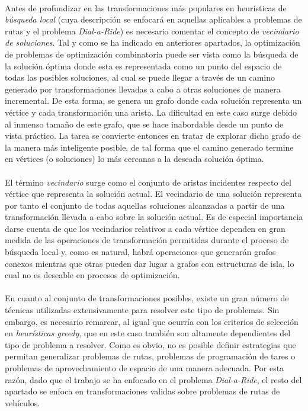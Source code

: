 \documentclass{subfiles}
\begin{document}
        \paragraph{}
        Antes de profundizar en las transformaciones más populares en heurísticas de \emph{búsqueda local} (cuya descripción se enfocará en aquellas aplicables a problemas de rutas y el problema \emph{Dial-a-Ride}) es necesario comentar el concepto de \emph{vecindario de soluciones}. Tal y como se ha indicado en anteriores apartados, la optimización de problemas de optimización combinatoria puede ser vista como la búsqueda de la solución óptima donde esta es representada como un punto del espacio de todas las posibles soluciones, al cual se puede llegar a través de un camino generado por transformaciones llevadas a cabo a otras soluciones de manera incremental. De esta forma, se genera un grafo donde cada solución representa un vértice y cada transformación una arista. La dificultad en este caso surge debido al inmenso tamaño de este grafo, que se hace inabordable desde un punto de vista práctico. La tarea se convierte entonces en tratar de explorar dicho grafo de la manera más inteligente posible, de tal forma que el camino generado termine en vértices (o soluciones) lo más cercanas a la deseada solución óptima.

        \paragraph{}
        El término \emph{vecindario} surge como el conjunto de aristas incidentes respecto del vértice que representa la solución actual. El vecindario de una solución representa por tanto el conjunto de todas aquellas soluciones alcanzadas a partir de una transformación llevada a cabo sobre la solución actual. Es de especial importancia darse cuenta de que los vecindarios relativos a cada vértice dependen en gran medida de las operaciones de transformación permitidas durante el proceso de búsqueda local y, como es natural, habrá operaciones que generarán grafos conexos mientras que otras pueden dar lugar a grafos con estructuras de isla, lo cual no es deseable en procesos de optimización.

        \paragraph{}
        En cuanto al conjunto de transformaciones posibles, existe un gran número de técnicas utilizadas extensivamente para resolver este tipo de problemas. Sin embargo, es necesario remarcar, al igual que ocurría con los criterios de selección en \emph{heurísticas greedy}, que en este caso también son altamente dependientes del tipo de problema a resolver. Como es obvio, no es posible definir estrategias que permitan generalizar problemas de rutas, problemas de programación de tares o problemas de aprovechamiento de espacio de una manera adecuada. Por esta razón, dado que el trabajo se ha enfocado en el problema \emph{Dial-a-Ride}, el resto del apartado se enfoca en transformaciones validas sobre problemas de rutas de vehículos.
\end{document}
